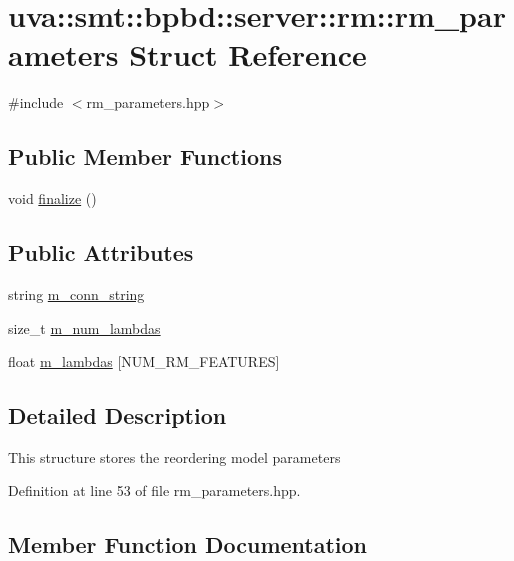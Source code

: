 \hypertarget{structuva_1_1smt_1_1bpbd_1_1server_1_1rm_1_1rm__parameters}{}\section{uva\+:\+:smt\+:\+:bpbd\+:\+:server\+:\+:rm\+:\+:rm\+\_\+parameters Struct Reference}
\label{structuva_1_1smt_1_1bpbd_1_1server_1_1rm_1_1rm__parameters}


{\ttfamily \#include $<$rm\+\_\+parameters.\+hpp$>$}

\subsection*{Public Member Functions}
\begin{DoxyCompactItemize}
\item 
void \hyperlink{structuva_1_1smt_1_1bpbd_1_1server_1_1rm_1_1rm__parameters_a15a05e0f0b3ff71be942c9d029a166a6}{finalize} ()
\end{DoxyCompactItemize}
\subsection*{Public Attributes}
\begin{DoxyCompactItemize}
\item 
string \hyperlink{structuva_1_1smt_1_1bpbd_1_1server_1_1rm_1_1rm__parameters_a682e0746e2bd3d741512d2e603e815f6}{m\+\_\+conn\+\_\+string}
\item 
size\+\_\+t \hyperlink{structuva_1_1smt_1_1bpbd_1_1server_1_1rm_1_1rm__parameters_a7628e93cac518235ba74d2a02f95a237}{m\+\_\+num\+\_\+lambdas}
\item 
float \hyperlink{structuva_1_1smt_1_1bpbd_1_1server_1_1rm_1_1rm__parameters_a97db004e1390ebc3f054ae7cbfabad41}{m\+\_\+lambdas} \mbox{[}N\+U\+M\+\_\+\+R\+M\+\_\+\+F\+E\+A\+T\+U\+R\+E\+S\mbox{]}
\end{DoxyCompactItemize}


\subsection{Detailed Description}
This structure stores the reordering model parameters 

Definition at line 53 of file rm\+\_\+parameters.\+hpp.



\subsection{Member Function Documentation}
\hypertarget{structuva_1_1smt_1_1bpbd_1_1server_1_1rm_1_1rm__parameters_a15a05e0f0b3ff71be942c9d029a166a6}{}

